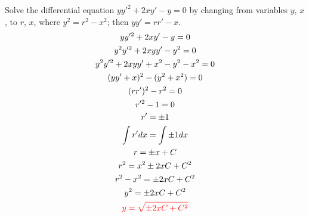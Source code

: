 \item [16.] Solve the differential equation $yy'^2 + 2xy' - y = 0$ by changing from variables $y$, $x$, to $r$, $x$, where $y^2= r^2 - x^2$; then $yy'= rr' - x$.
\begin{gather*}
    yy'^2 + 2xy' - y = 0\\
    y^2y'^2 + 2xyy' - y^2 = 0\\
    y^2y'^2 + 2xyy' +x^2 - y^2 - x^2 = 0\\
    (yy' + x)^2 - (y^2 + x^2) = 0\\
    (rr')^2 - r^2 = 0\\
    r'^2 - 1 = 0\\
    r' = \pm 1 \\
    \int r' dx = \int \pm 1 dx\\
    r = \pm x + C\\
    r^2 = x^2 \pm 2xC + C^2\\
    r^2 - x^2 = \pm 2xC + C^2\\
    y^2 = \pm 2xC + C^2\\
    \textcolor{red}{
    y = \sqrt{\pm 2xC + C^2}
    }
\end{gather*}